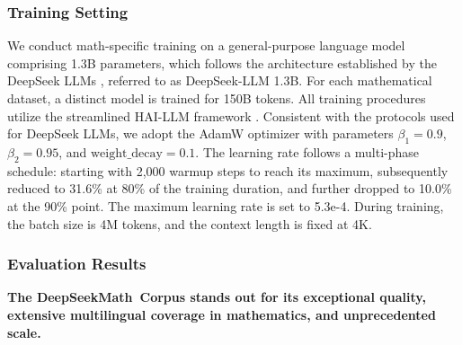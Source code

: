 \subsubsection{Training Setting}
\label{sec:quality-policy}
We conduct math-specific training on a general-purpose language model comprising 1.3B parameters, which follows the architecture established by the DeepSeek LLMs \citep{deepseek-llm}, referred to as DeepSeek-LLM 1.3B. For each mathematical dataset, a distinct model is trained for 150B tokens. All training procedures utilize the streamlined HAI-LLM framework \citep{haillm}. Consistent with the protocols used for DeepSeek LLMs, we adopt the AdamW optimizer \citep{adamW} with parameters $\beta_1=0.9$, $\beta_2=0.95$, and $\mathrm{weight\_decay}=0.1$. The learning rate follows a multi-phase schedule: starting with 2,000 warmup steps to reach its maximum, subsequently reduced to 31.6\% at 80\% of the training duration, and further dropped to 10.0\% at the 90\% point. The maximum learning rate is set to 5.3e-4. During training, the batch size is 4M tokens, and the context length is fixed at 4K.

\subsubsection{Evaluation Results}

\textbf{The DeepSeekMath~Corpus stands out for its exceptional quality, extensive multilingual coverage in mathematics, and unprecedented scale.}

